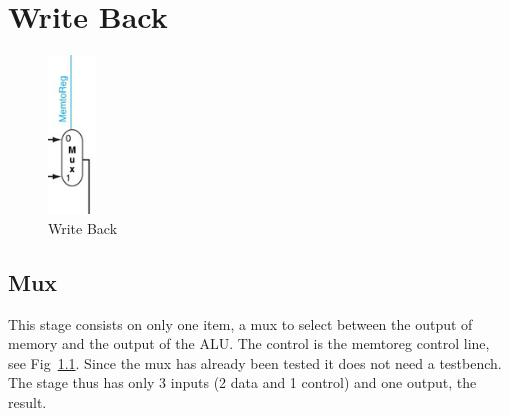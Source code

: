 \chapter{Write Back}


\begin{figure}
\caption{Write Back}\label{fig:wb}
\begin{center}
\includegraphics[width=0.5in]{../images/pipeline_writeback.png}
\end{center}
\end{figure}

\WrapBarrier

\section{Mux}
This stage consists on only one item, a mux to select between the output of memory and the output of the ALU.  The control is the memtoreg control line, see Fig~\ref{fig:wb}.  Since the mux has already been tested it does not need a testbench.  The stage thus has only 3 inputs (2 data and 1 control) and one output, the result.

